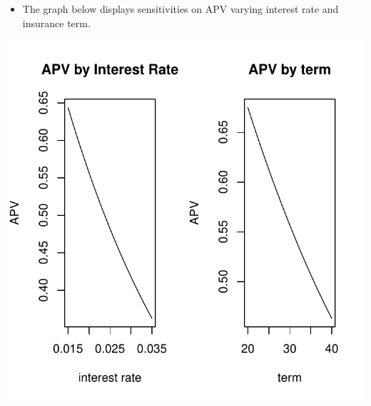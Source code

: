 \documentclass[ignorenonframetext,]{beamer}
\begin{document}
\begin{frame}

\begin{itemize}[<+->]
\itemsep1pt\parskip0pt
\item
  The graph below displays sensitivities on APV varying interest rate
  and insurance term.
\end{itemize}

\begin{center}\includegraphics{introToLifecontingencies_files/figure-beamer/endowmentplot-1} \end{center}

\end{frame}
\end{document}
